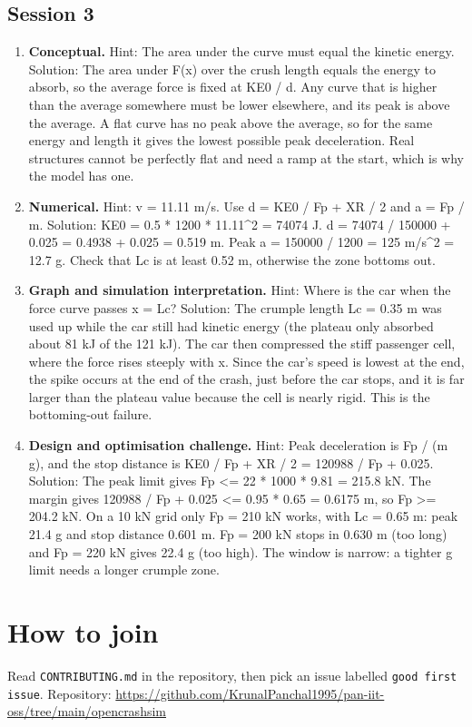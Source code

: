 \documentclass[11pt,a4paper]{article}
\begin{document}
\subsection*{Session 3}
\begin{enumerate}[nosep]
\item \textbf{Conceptual.} Hint: The area under the curve must equal the kinetic energy. Solution: The area under F(x) over the crush length equals the energy to absorb, so the average force is fixed at KE0 / d. Any curve that is higher than the average somewhere must be lower elsewhere, and its peak is above the average. A flat curve has no peak above the average, so for the same energy and length it gives the lowest possible peak deceleration. Real structures cannot be perfectly flat and need a ramp at the start, which is why the model has one.
\item \textbf{Numerical.} Hint: v = 11.11 m/s. Use d = KE0 / Fp + XR / 2 and a = Fp / m. Solution: KE0 = 0.5 * 1200 * 11.11\textasciicircum{}2 = 74074 J. d = 74074 / 150000 + 0.025 = 0.4938 + 0.025 = 0.519 m. Peak a = 150000 / 1200 = 125 m/s\textasciicircum{}2 = 12.7 g. Check that Lc is at least 0.52 m, otherwise the zone bottoms out.
\item \textbf{Graph and simulation interpretation.} Hint: Where is the car when the force curve passes x = Lc? Solution: The crumple length Lc = 0.35 m was used up while the car still had kinetic energy (the plateau only absorbed about 81 kJ of the 121 kJ). The car then compressed the stiff passenger cell, where the force rises steeply with x. Since the car's speed is lowest at the end, the spike occurs at the end of the crash, just before the car stops, and it is far larger than the plateau value because the cell is nearly rigid. This is the bottoming-out failure.
\item \textbf{Design and optimisation challenge.} Hint: Peak deceleration is Fp / (m g), and the stop distance is KE0 / Fp + XR / 2 = 120988 / Fp + 0.025. Solution: The peak limit gives Fp \textless{}= 22 * 1000 * 9.81 = 215.8 kN. The margin gives 120988 / Fp + 0.025 \textless{}= 0.95 * 0.65 = 0.6175 m, so Fp \textgreater{}= 204.2 kN. On a 10 kN grid only Fp = 210 kN works, with Lc = 0.65 m: peak 21.4 g and stop distance 0.601 m. Fp = 200 kN stops in 0.630 m (too long) and Fp = 220 kN gives 22.4 g (too high). The window is narrow: a tighter g limit needs a longer crumple zone.
\end{enumerate}

\section{How to join}
Read \texttt{CONTRIBUTING.md} in the repository, then pick an issue labelled \texttt{good first issue}. Repository: \url{https://github.com/KrunalPanchal1995/pan-iit-oss/tree/main/opencrashsim}
\end{document}
